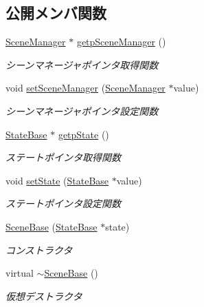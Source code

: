 \subsection*{公開メンバ関数}
\begin{DoxyCompactItemize}
\item 
\mbox{\hyperlink{class_scene_manager}{Scene\+Manager}} $\ast$ \mbox{\hyperlink{class_scene_base_a4c0b75d2f7ead08828f1e5064aa99720}{getp\+Scene\+Manager}} ()
\begin{DoxyCompactList}\small\item\em シーンマネージャポインタ取得関数 \end{DoxyCompactList}\item 
void \mbox{\hyperlink{class_scene_base_aae1930cae97c27ee7d54b4bd8896a515}{set\+Scene\+Manager}} (\mbox{\hyperlink{class_scene_manager}{Scene\+Manager}} $\ast$value)
\begin{DoxyCompactList}\small\item\em シーンマネージャポインタ設定関数 \end{DoxyCompactList}\item 
\mbox{\hyperlink{class_scene_base_1_1_state_base}{State\+Base}} $\ast$ \mbox{\hyperlink{class_scene_base_acfea243cbece18d596f2dacad19a345c}{getp\+State}} ()
\begin{DoxyCompactList}\small\item\em ステートポインタ取得関数 \end{DoxyCompactList}\item 
void \mbox{\hyperlink{class_scene_base_a95d33774db6a05cf1e9da201720ea3db}{set\+State}} (\mbox{\hyperlink{class_scene_base_1_1_state_base}{State\+Base}} $\ast$value)
\begin{DoxyCompactList}\small\item\em ステートポインタ設定関数 \end{DoxyCompactList}\item 
\mbox{\hyperlink{class_scene_base_aeafd60485ad8b2191f40da3013d50f2c}{Scene\+Base}} (\mbox{\hyperlink{class_scene_base_1_1_state_base}{State\+Base}} $\ast$state)
\begin{DoxyCompactList}\small\item\em コンストラクタ \end{DoxyCompactList}\item 
virtual \mbox{\hyperlink{class_scene_base_a187dd160e5a16909bcc6529851e38318}{$\sim$\+Scene\+Base}} ()
\begin{DoxyCompactList}\small\item\em 仮想デストラクタ \end{DoxyCompactList}\item 

\end{DoxyCompactItemize}
